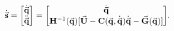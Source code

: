 \documentclass[
    crop,
    margin=0.05in,
    convert={density=150}
]{standalone}
\begin{document}
    $\displaystyle
        \dot{\va{s}} = \mqty[\dot{\va{q}} \\ \ddot{\va{q}}] = \mqty[\dot{\va{q}} \\ \vb{H}^{-1}(\va{q})[\va{U} - \vb{C}(\va{q}, \dot{\va{q}})\dot{\va{q}} - \va{G}(\va{q})]].
    $
\end{document}

